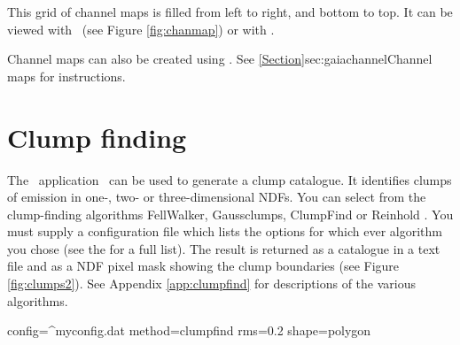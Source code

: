 \documentclass[11pt,oneside,chapters]{starlink}
\begin{document}
\begin{terminalv}
\end{terminalv}
This grid of channel maps is filled from left to right, and bottom to
top. It can be viewed with \gaia\ (see Figure \ref{fig:chanmap}) or
with \display.
\begin{terminalv}
\end{terminalv}

Channel maps can also be created using \gaia. See
\cref{Section}{sec:gaiachannel}{Channel maps} for instructions.



\section{Clump finding}
\label{sec:clumpfind}

The \cupid\ application \findclumps\ can be used to generate a clump
catalogue. It identifies clumps of emission in one-, two- or
three-dimensional NDFs. You can select from the clump-finding
algorithms FellWalker, Gaussclumps, ClumpFind or Reinhold . You must
supply a configuration file which lists the options for which ever
algorithm you chose (see the 
for a full list). The result is returned as a catalogue in a text file
and as a NDF pixel mask showing the clump boundaries (see Figure
\ref{fig:clumps2}). See Appendix \ref{app:clumpfind} for descriptions
of the various algorithms.

\begin{terminalv}
  config=^myconfig.dat method=clumpfind rms=0.2 shape=polygon
\end{terminalv}
\end{document}
